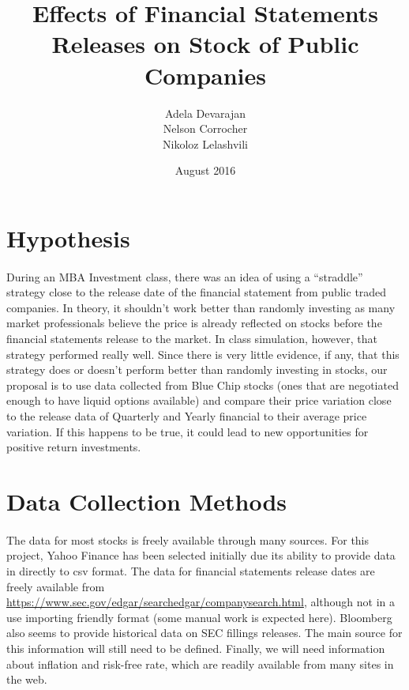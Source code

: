\documentclass[11pt, a4paper]{article}
\title{Effects of Financial Statements Releases on Stock of Public Companies}
\author{Adela Devarajan\\Nelson Corrocher\\Nikoloz Lelashvili}
\date{August 2016}
\begin{document}
\maketitle
\section{Hypothesis}
\paragraph{}During an MBA Investment class, there was an idea of using a “straddle” strategy close to the release date of the financial statement from public traded companies. In theory, it shouldn't work better than randomly investing as many market professionals believe the price is already reflected on stocks before the financial statements release to the market. In class simulation, however, that strategy performed really well. Since there is very little evidence, if any, that this strategy does or doesn't perform better than randomly investing in stocks, our proposal is to use data collected from Blue Chip stocks (ones that are negotiated enough to have liquid options available) and compare their price variation close to the release data of Quarterly and Yearly financial to their average price variation. If this happens to be true, it could lead to new opportunities for positive return investments.
\section{Data Collection Methods}
\paragraph{}The data for most stocks is freely available through many sources. For this project, Yahoo Finance has been selected initially due its ability to provide data in directly to csv format. The data for financial statements release dates are freely available from \url{https://www.sec.gov/edgar/searchedgar/companysearch.html}, although not in a use importing friendly format (some manual work is expected here). Bloomberg also seems to provide historical data on SEC fillings releases. The main source for this information will still need to be defined. Finally, we will need information about inflation and risk-free rate, which are readily available from many sites in the web. 
\end{document}
